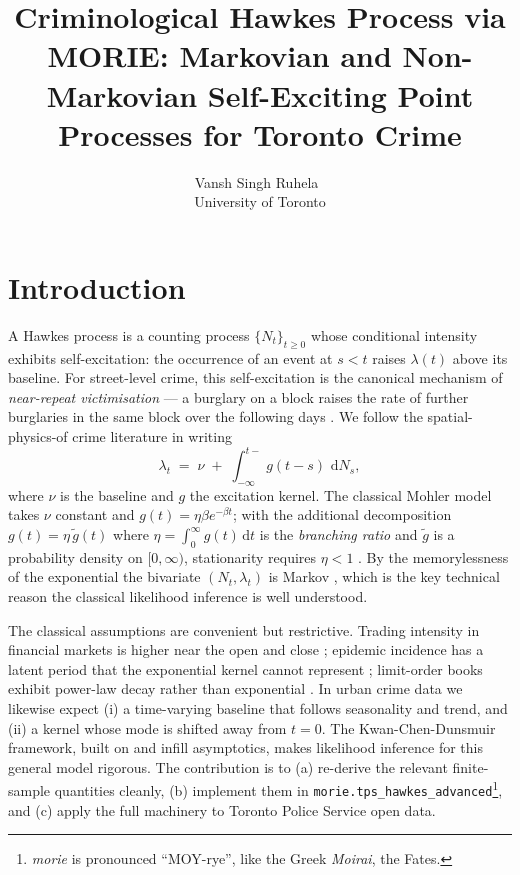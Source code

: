 \documentclass[article,shortnames,nojss]{jss}
\title{Criminological Hawkes Process via MORIE: Markovian and
       Non-Markovian Self-Exciting Point Processes for Toronto Crime}
\author{Vansh Singh Ruhela~\orcidlink{0009-0004-1750-3592}\\University of Toronto}
\newcommand{\rmd}{\,\mathrm{d}}
\newcommand{\1}{\mathbbm{1}}
\theoremstyle{plain}
\theoremstyle{definition}
\begin{document}
\sloppy

\section{Introduction}\label{sec:intro}

A Hawkes process \citep{Hawkes1971} is a counting process
$\{N_t\}_{t \ge 0}$ whose conditional intensity exhibits
self-excitation: the occurrence of an event at $s < t$ raises
$\lambda(t)$ above its baseline.  For street-level crime, this
self-excitation is the canonical mechanism of \emph{near-repeat
victimisation} --- a burglary on a block raises the rate of further
burglaries in the same block over the following days
\citep{Mohler2011,short2010pde}.  We follow the spatial-physics-of
crime literature in writing
\begin{equation}\label{eq:complete-intensity}
  \lambda_t \;=\; \nu \;+\; \int_{-\infty}^{t-}\! g(t-s)\,\rmd N_s,
\end{equation}
where $\nu$ is the baseline and $g$ the excitation kernel.  The
classical Mohler model takes $\nu$ constant and $g(t)=\eta\beta
e^{-\beta t}$; with the additional decomposition $g(t) = \eta\,
\tilde g(t)$ where $\eta = \int_0^\infty g(t)\rmd t$ is the
\emph{branching ratio} and $\tilde g$ is a probability density on
$[0,\infty)$, stationarity requires $\eta < 1$ \citep{Daley2003}.
By the memorylessness of the exponential the bivariate
$(N_t,\lambda_t)$ is Markov \citep{oakes1975markovian}, which is the
key technical reason the classical likelihood inference is well
understood.

The classical assumptions are convenient but restrictive.  Trading
intensity in financial markets is higher near the open and close
\citep{engle1998autoregressive,kwan2023asymptotic}; epidemic
incidence has a latent period that the exponential kernel cannot
represent \citep{lauer2020incubation,escobar2020hawkes}; limit-order
books exhibit power-law decay rather than exponential
\citep{bacry2015hawkes,gould2013limit}.  In urban crime data we
likewise expect (i) a time-varying baseline that follows seasonality
and trend, and (ii) a kernel whose mode is shifted away from $t=0$.
The Kwan-Chen-Dunsmuir framework, built on \citep{kwan2024ergodic}
and infill asymptotics, makes likelihood inference for this general
model rigorous.  The contribution is to (a) re-derive the relevant
finite-sample quantities cleanly, (b) implement them in
\texttt{morie.tps\_hawkes\_advanced}\footnote{\textit{morie} is
pronounced ``MOY-rye'', like the Greek \textit{Moirai},
the Fates.}, and (c) apply the full
machinery to Toronto Police Service open data.
\end{document}
